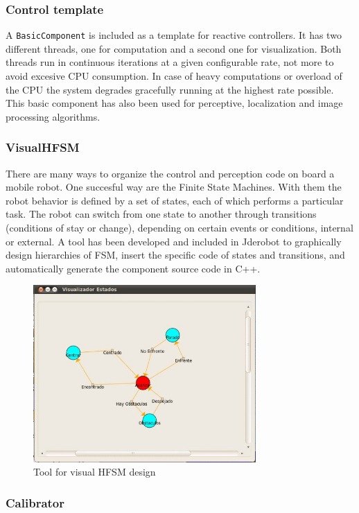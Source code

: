\documentclass[twocolumn]{svjour3}          %
\begin{document}
\subsubsection{Control template}

A \texttt{BasicComponent} is included as a template for reactive controllers. It has two different threads, one for computation and a second one for visualization. Both threads run in continuous iterations at a given configurable rate, not more to avoid excesive CPU consumption. In case of heavy computations or overload of the CPU the system degrades gracefully running at the highest rate possible. This basic component has also been used for perceptive, localization and image processing algorithms.

\subsubsection{VisualHFSM}

There are many ways to organize the control and perception code on board a mobile robot. One succesful way are the Finite State Machines. With them the robot behavior is defined by a set of states, each of which performs a particular task. The robot can switch from one state to another through transitions (conditions of stay or change), depending on certain events or conditions, internal or external. A tool has been developed and included in Jderobot to graphically design hierarchies of FSM, insert the specific code of states and transitions, and automatically generate the component source code in C++.

\begin{figure}[h!]
  \includegraphics[width=8.5cm]{figs/ratonGatoAutoEjec.jpg}
\caption{Tool for visual HFSM design}
\label{fig:visualHFSM}
\end{figure}

\subsubsection{Calibrator}
\end{document}
